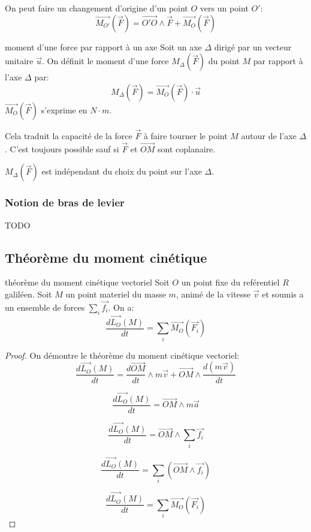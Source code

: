 \begin{remark}{}{}
    On peut faire un changement d'origine d'un point $O$ vers un point $O'$:
    \[\vec{M_{O'}}(\vec{F}) = \vec{O'O} \wedge \vec{F} + \vec{M_{O}}(\vec{F})\]
\end{remark}

\begin{definition}{moment d'une force par rapport à un axe}{}
    Soit un axe $\Delta$ dirigé par un vecteur unitaire $\vec{u}$. 
    \newline
    On définit le moment d'une force $M_{\Delta}(\vec{F})$ du point $M$ par rapport à l'axe
    $\Delta$ par:
    \[M_{\Delta}(\vec{F}) = \vec{M_{O}}(\vec{F}) \cdot \vec{u}\]
    $\vec{M_{O}}(\vec{F})$ s'exprime en $N \cdot m$. 

    Cela traduit la capacité de la force $\vec{F}$ à faire tourner
    le point $M$ autour de l'axe $\Delta$.
    C'est toujours possible sauf si $\vec{F}$ et $\vec{OM}$ sont coplanaire.
\end{definition}

\begin{remark}{}{}
    $M_{\Delta}(\vec{F})$ est indépendant du choix du point sur l'axe $\Delta$.
\end{remark}


\subsubsection*{Notion de bras de levier}
TODO


\subsection{Théorème du moment cinétique}

\begin{theorem}{théorème du moment cinétique vectoriel}{}
Soit $O$ un point fixe du reférentiel $R$ galiléen.
\newline
Soit $M$ un point materiel du masse $m$, animé de la vitesse $\vec{v}$ et soumis
a un ensemble de forces $\sum_{i}\vec{f_{i}}$.
On a:
\[\frac{d\vec{L_{O}}(M)}{dt} = \sum_{i} \vec{M_{O}}(\vec{F_{i}})\]
\end{theorem}

\begin{proof}
    On démontre le théorème du moment cinétique vectoriel:
    \[\frac{d\vec{L_{O}}(M)}{dt} = 
    \frac{d\vec{OM}}{dt} \wedge m\vec{v} 
    + \vec{OM} \wedge \frac{d(m\vec{v})}{dt}\]

    \[\frac{d\vec{L_{O}}(M)}{dt} = \vec{OM} \wedge m\vec{a}\]

    \[\frac{d\vec{L_{O}}(M)}{dt} = \vec{OM} \wedge \sum_{i}\vec{f_{i}}\]

    \[\frac{d\vec{L_{O}}(M)}{dt} = \sum_{i} (\vec{OM} \wedge \vec{f_{i}})\]

    \[\frac{d\vec{L_{O}}(M)}{dt} = \sum_{i} \vec{M_{O}}(\vec{F_{i}})\]
    
\end{proof}

